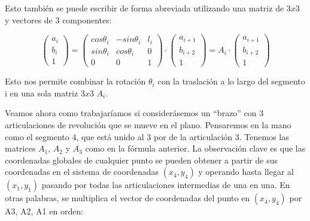 Esto también se puede escribir de forma abreviada utilizando una matriz de $3x3$ y vectores de 3 componentes:

\begin{equation}
\begin{pmatrix} 
a_{i} \\ 
b_{i} \\
1
\end{pmatrix} = 
\begin{pmatrix} 
cos\theta_{i} & -sin\theta_{i} & l_{i}\\
sin\theta_{i} & cos\theta_{i}  & 0 \\
0 & 0 & 1
\end{pmatrix} \cdotp
\begin{pmatrix} 
a_{i+1} \\
b_{i+2} \\
1
\end{pmatrix} = A_{i} \cdotp
\begin{pmatrix} 
a_{i+1} \\ 
b_{i+2} \\
1
\end{pmatrix}
\end{equation}

Esto nos permite combinar la rotación $\theta_{i}$ con la traslación a lo largo del segmento i en una sola matriz $3x3$ $A_{i}$.

Veamos ahora como trabajaríamos si considerásemos un ``brazo'' con 3 articulaciones de revolución que se mueve en el plano. Pensaremos en la mano como el segmento 4, que está unido al 3 por de la articulación 3. Tenemos las matrices $A_{1}$, $A_{2}$ y $A_{3}$ como en la fórmula anterior. La observación clave es que las coordenadas globales de cualquier punto se pueden obtener a partir de sus coordenadas en el sistema de coordenadas $(x_{4},y_{4})$ y operando hasta llegar al $(x_{1},y_{1})$ pasando por todas las articulaciones intermedias de una en una. En otras palabras, se multiplica el vector de coordenadas del punto en $(x_{4},y_{4})$ por A3, A2, A1 en orden:


